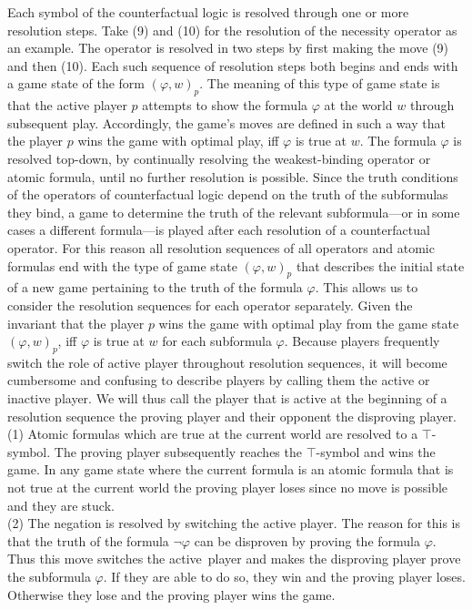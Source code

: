 \documentclass[a4paper,american]{paper}
\theoremstyle{definition}\newtheorem{definition}{Definition}
\begin{document}
\noindent Each symbol of the counterfactual logic is resolved through one or more resolution steps. Take (9) and (10) for the resolution of the necessity operator as an example. The operator is resolved in two steps by first making the move (9) and then (10). Each such sequence of resolution steps both begins and ends with a game state of the form $(\varphi ,w)_p$. The meaning of this type of game state is that the active player $p$ attempts to show the formula $\varphi$ at the world $w$ through subsequent play. Accordingly, the game's moves are defined in such a way that the player $p$ wins the game with optimal play, iff $\varphi$ is true at $w$. The formula $\varphi$ is resolved top-down, by continually resolving the weakest-binding operator or atomic formula, until no further resolution is possible. Since the truth conditions of the operators of counterfactual logic depend on the truth of the subformulas they bind, a game to determine the truth of the relevant subformula---or in some cases a different formula---is played after each resolution of a counterfactual operator. For this reason all resolution sequences of all operators and atomic formulas end with the type of game state $(\varphi ,w)_p$ that describes the initial state of a new game pertaining to the truth of the formula $\varphi$. This allows us to consider the resolution sequences for each operator separately. Given the invariant that the player $p$ wins the game with optimal play from the game state $(\varphi ,w)_p$, iff $\varphi$ is true at $w$ for each subformula $\varphi$. Because players frequently switch the role of active player throughout resolution sequences, it will become cumbersome and confusing to describe players by calling them the active or inactive player. We will thus call the player that is active at the beginning of a resolution sequence the proving player and their opponent the disproving player.\\
\indent (1) Atomic formulas which are true at the current world are resolved to a $\top$-symbol. The proving player subsequently reaches the $\top$-symbol and wins the game. In any game state where the current formula is an atomic formula that is not true at the current world the proving player loses since no move is possible and they are stuck.\\
\indent (2) The negation is resolved by switching the active player. The reason for this is that the truth of the formula $\neg\varphi$ can be disproven by proving the formula $\varphi$. Thus this move switches the active~player and makes the disproving player prove the subformula $\varphi$. If they are able to do so, they win and the proving player loses. Otherwise they lose and the proving player wins the game.\\
\end{document}
